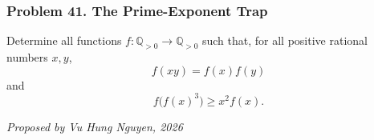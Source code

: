 \subsubsection*{Problem 41. The Prime-Exponent Trap}

\begin{exercisebox}[hard]

Determine all functions $f:\mathbb Q_{>0}\to\mathbb Q_{>0}$ such that, for all positive rational numbers $x,y$,
\[
f(xy)=f(x)f(y)
\]
and
\[
\boxed{\qquad f\bigl(f(x)^3\bigr)\ge x^2f(x).\qquad}
\]

\begin{flushright}
\textit{Proposed by Vu Hung Nguyen, 2026}
\end{flushright}


\end{exercisebox}
